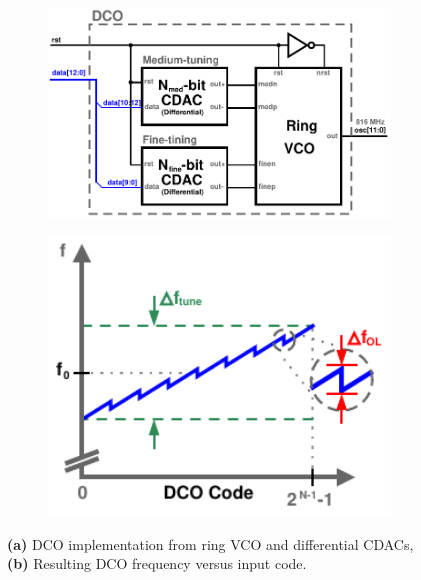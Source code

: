 	\begin{figure}[htb!]
	    \centering
	    \begin{subfigure}{0.5\textwidth}
	        \centering
	        \includegraphics[width=1\textwidth, angle=0]{./figs/design/dco_block}
	        \caption{ }
	        \label{fig:dco_block}
	    \end{subfigure}%
	    \begin{subfigure}{0.5\textwidth}
	        \centering
	        \includegraphics[width=1\textwidth, angle=0]{./figs/design/tuning_dco}
	        \caption{ }
	        \label{fig:tuning_dco}
	    \end{subfigure}
	    \label{fig:dco_design}
	    \caption{\textbf{(a)} DCO implementation from ring VCO and differential CDACs, \textbf{(b)} Resulting DCO frequency versus input code.}
	\end{figure} 

